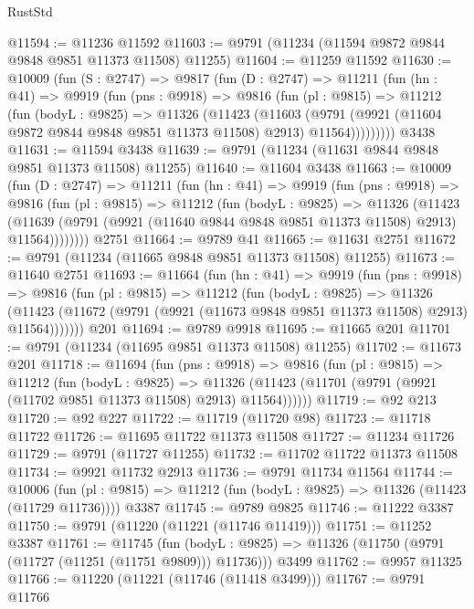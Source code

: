 \begin{lexlean}{RustStd}
\begin{coremodule}
@11594 := @11236 @11592
@11603 := @9791 (@11234 (@11594 @9872 @9844 @9848 @9851 @11373 @11508) @11255)
@11604 := @11259 @11592
@11630 := @10009
    (fun (S : @2747) =>
    @9817
      (fun (D : @2747) =>
      @11211
        (fun (hn : @41) =>
        @9919
          (fun (pns : @9918) =>
          @9816
            (fun (pl : @9815) =>
            @11212
              (fun (bodyL : @9825) =>
              @11326
                (@11423
                  (@11603
                    (@9791
                      (@9921 (@11604 @9872 @9844 @9848 @9851 @11373 @11508) @2913)
                      @11564)))))))))
    @3438
@11631 := @11594 @3438
@11639 := @9791 (@11234 (@11631 @9844 @9848 @9851 @11373 @11508) @11255)
@11640 := @11604 @3438
@11663 := @10009
    (fun (D : @2747) =>
    @11211
      (fun (hn : @41) =>
      @9919
        (fun (pns : @9918) =>
        @9816
          (fun (pl : @9815) =>
          @11212
            (fun (bodyL : @9825) =>
            @11326
              (@11423
                (@11639 (@9791 (@9921 (@11640 @9844 @9848 @9851 @11373 @11508) @2913) @11564))))))))
    @2751
@11664 := @9789 @41
@11665 := @11631 @2751
@11672 := @9791 (@11234 (@11665 @9848 @9851 @11373 @11508) @11255)
@11673 := @11640 @2751
@11693 := @11664
    (fun (hn : @41) =>
    @9919
      (fun (pns : @9918) =>
      @9816
        (fun (pl : @9815) =>
        @11212
          (fun (bodyL : @9825) =>
          @11326
            (@11423 (@11672 (@9791 (@9921 (@11673 @9848 @9851 @11373 @11508) @2913) @11564)))))))
    @201
@11694 := @9789 @9918
@11695 := @11665 @201
@11701 := @9791 (@11234 (@11695 @9851 @11373 @11508) @11255)
@11702 := @11673 @201
@11718 := @11694
    (fun (pns : @9918) =>
    @9816
      (fun (pl : @9815) =>
      @11212
        (fun (bodyL : @9825) =>
        @11326 (@11423 (@11701 (@9791 (@9921 (@11702 @9851 @11373 @11508) @2913) @11564))))))
@11719 := @92 @213
@11720 := @92 @227
@11722 := @11719 (@11720 @98)
@11723 := @11718 @11722
@11726 := @11695 @11722 @11373 @11508
@11727 := @11234 @11726
@11729 := @9791 (@11727 @11255)
@11732 := @11702 @11722 @11373 @11508
@11734 := @9921 @11732 @2913
@11736 := @9791 @11734 @11564
@11744 := @10006
    (fun (pl : @9815) => @11212 (fun (bodyL : @9825) => @11326 (@11423 (@11729 @11736))))
    @3387
@11745 := @9789 @9825
@11746 := @11222 @3387
@11750 := @9791 (@11220 (@11221 (@11746 @11419)))
@11751 := @11252 @3387
@11761 := @11745
    (fun (bodyL : @9825) => @11326 (@11750 (@9791 (@11727 (@11251 (@11751 @9809))) @11736)))
    @3499
@11762 := @9957 @11325
@11766 := @11220 (@11221 (@11746 (@11418 @3499)))
@11767 := @9791 @11766

\end{coremodule}
\end{lexlean}
